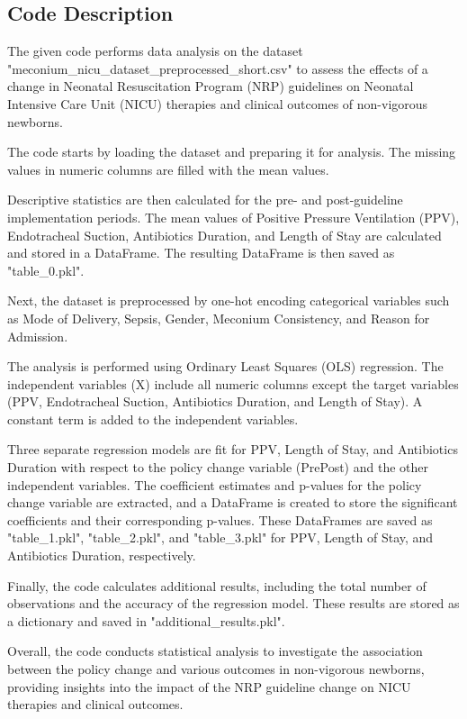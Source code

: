 \documentclass[11pt]{article}
\begin{document}
\subsection{Code Description}

The given code performs data analysis on the dataset "meconium\_nicu\_dataset\_preprocessed\_short.csv" to assess the effects of a change in Neonatal Resuscitation Program (NRP) guidelines on Neonatal Intensive Care Unit (NICU) therapies and clinical outcomes of non-vigorous newborns. 

The code starts by loading the dataset and preparing it for analysis. The missing values in numeric columns are filled with the mean values. 

Descriptive statistics are then calculated for the pre- and post-guideline implementation periods. The mean values of Positive Pressure Ventilation (PPV), Endotracheal Suction, Antibiotics Duration, and Length of Stay are calculated and stored in a DataFrame. The resulting DataFrame is then saved as "table\_0.pkl".

Next, the dataset is preprocessed by one-hot encoding categorical variables such as Mode of Delivery, Sepsis, Gender, Meconium Consistency, and Reason for Admission. 

The analysis is performed using Ordinary Least Squares (OLS) regression. The independent variables (X) include all numeric columns except the target variables (PPV, Endotracheal Suction, Antibiotics Duration, and Length of Stay). A constant term is added to the independent variables. 

Three separate regression models are fit for PPV, Length of Stay, and Antibiotics Duration with respect to the policy change variable (PrePost) and the other independent variables. The coefficient estimates and p-values for the policy change variable are extracted, and a DataFrame is created to store the significant coefficients and their corresponding p-values. These DataFrames are saved as "table\_1.pkl", "table\_2.pkl", and "table\_3.pkl" for PPV, Length of Stay, and Antibiotics Duration, respectively. 

Finally, the code calculates additional results, including the total number of observations and the accuracy of the regression model. These results are stored as a dictionary and saved in "additional\_results.pkl".

Overall, the code conducts statistical analysis to investigate the association between the policy change and various outcomes in non-vigorous newborns, providing insights into the impact of the NRP guideline change on NICU therapies and clinical outcomes.
\end{document}
